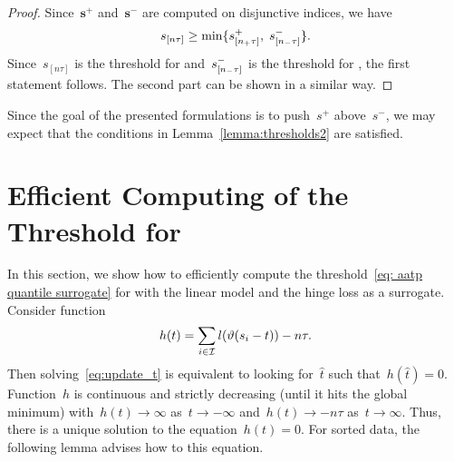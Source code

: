 \begin{proof}
  Since~$\bm{s}^+$ and~$\bm{s}^-$ are computed on disjunctive indices, we have
  \begin{equation*}
    s_{[n\tau]} \geq \min\{s_{[n_{+}\tau]}^+, \; s_{[n_{-}\tau]}^-\}.
  \end{equation*}
  Since~$s_{[n\tau]}$ is the threshold for \Grill and~$s_{[n_{-}\tau]}^-$ is the threshold for \GrillNP, the first statement follows. The second part can be shown in a similar way.
\end{proof}

Since the goal of the presented formulations is to push~$s^+$ above~$s^-$, we may expect that the conditions in Lemma~\ref{lemma:thresholds2} are satisfied. 

\section{Efficient Computing of the Threshold for \PatMat}\label{app:threshold}

In this section, we show how to efficiently compute the threshold~\eqref{eq: aatp quantile surrogate} for \PatMat with the linear model and the hinge loss as a surrogate. Consider function
\begin{equation}\label{eq:defin_h}
  h(t) = \sum_{i \in \I} l\Brac{\vartheta(s_i - t)} - n\tau.
\end{equation}
Then solving~\eqref{eq:update_t} is equivalent to looking for~$\hat{t}$ such that~$h(\hat{t}) = 0$. Function~$h$ is continuous and strictly decreasing (until it hits the global minimum) with~$h(t) \to \infty$ as~$t \to -\infty$ and~$h(t) \to -n\tau$ as~$t \to \infty$. Thus, there is a unique solution to the equation~$h(t) = 0$. For sorted data, the following lemma advises how to this equation.

